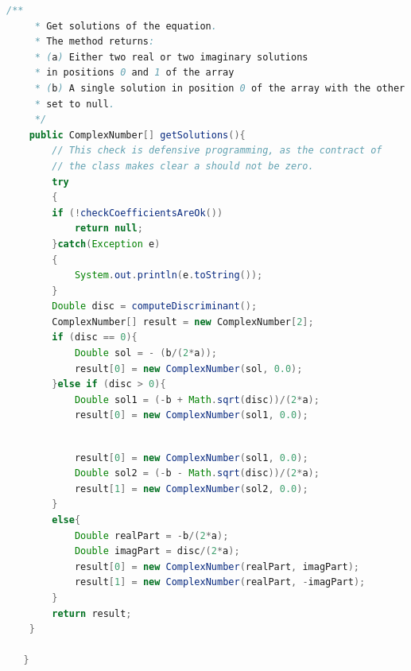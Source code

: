 \documentclass[11pt, xcolor=svgnames]{beamer}
\begin{document}

\begin{frame}[fragile]


\begin{lstlisting}[language=Java,basicstyle=\tiny]
  /**
     * Get solutions of the equation.
     * The method returns:
     * (a) Either two real or two imaginary solutions
     * in positions 0 and 1 of the array
     * (b) A single solution in position 0 of the array with the other
     * set to null.
     */
    public ComplexNumber[] getSolutions(){
        // This check is defensive programming, as the contract of
        // the class makes clear a should not be zero.
    	try
    	{
    	if (!checkCoefficientsAreOk())
            return null;
    	}catch(Exception e)
    	{
    		System.out.println(e.toString());
    	}
        Double disc = computeDiscriminant();
        ComplexNumber[] result = new ComplexNumber[2];
        if (disc == 0){
            Double sol = - (b/(2*a));
            result[0] = new ComplexNumber(sol, 0.0);
        }else if (disc > 0){
            Double sol1 = (-b + Math.sqrt(disc))/(2*a);
            result[0] = new ComplexNumber(sol1, 0.0);

\end{lstlisting}
\end{frame}


\begin{frame}[fragile]

\begin{lstlisting}[language=JAVA,basicstyle=\tiny]

            result[0] = new ComplexNumber(sol1, 0.0);
            Double sol2 = (-b - Math.sqrt(disc))/(2*a);
            result[1] = new ComplexNumber(sol2, 0.0);
        }
        else{
            Double realPart = -b/(2*a);
            Double imagPart = disc/(2*a);
            result[0] = new ComplexNumber(realPart, imagPart);
            result[1] = new ComplexNumber(realPart, -imagPart);
        }
        return result;
    }

   }
\end{lstlisting}
\end{frame}


\end{document}
